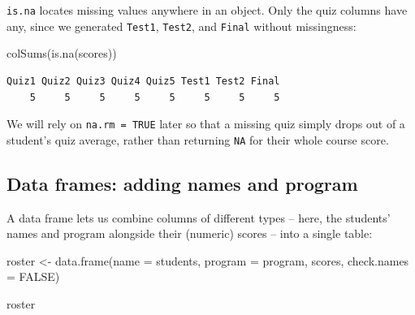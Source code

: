 \documentclass[
  letterpaper,
  DIV=11,
  numbers=noendperiod]{scrreprt}
\newenvironment{Shaded}{\begin{snugshade}}{\end{snugshade}}
\newcommand{\AttributeTok}[1]{\textcolor[rgb]{0.40,0.45,0.13}{#1}}
\newcommand{\ConstantTok}[1]{\textcolor[rgb]{0.56,0.35,0.01}{#1}}
\newcommand{\FunctionTok}[1]{\textcolor[rgb]{0.28,0.35,0.67}{#1}}
\newcommand{\NormalTok}[1]{\textcolor[rgb]{0.00,0.23,0.31}{#1}}
\newcommand{\OtherTok}[1]{\textcolor[rgb]{0.00,0.23,0.31}{#1}}
\begin{document}
\texttt{is.na} locates missing values anywhere in an object. Only the
quiz columns have any, since we generated \texttt{Test1},
\texttt{Test2}, and \texttt{Final} without missingness:

\begin{Shaded}
\begin{Highlighting}[]
\FunctionTok{colSums}\NormalTok{(}\FunctionTok{is.na}\NormalTok{(scores))}
\end{Highlighting}
\end{Shaded}

\begin{verbatim}
Quiz1 Quiz2 Quiz3 Quiz4 Quiz5 Test1 Test2 Final 
    5     5     5     5     5     5     5     5 
\end{verbatim}

We will rely on \texttt{na.rm\ =\ TRUE} later so that a missing quiz
simply drops out of a student's quiz average, rather than returning
\texttt{NA} for their whole course score.

\subsection{Data frames: adding names and
program}\label{data-frames-adding-names-and-program}

A data frame lets us combine columns of different types -- here, the
students' names and program alongside their (numeric) scores -- into a
single table:

\begin{Shaded}
\begin{Highlighting}[]
\NormalTok{roster }\OtherTok{\textless{}{-}} \FunctionTok{data.frame}\NormalTok{(}\AttributeTok{name =}\NormalTok{ students, }\AttributeTok{program =}\NormalTok{ program, scores, }\AttributeTok{check.names =} \ConstantTok{FALSE}\NormalTok{)}

\NormalTok{roster}
\end{Highlighting}
\end{Shaded}
\end{document}

